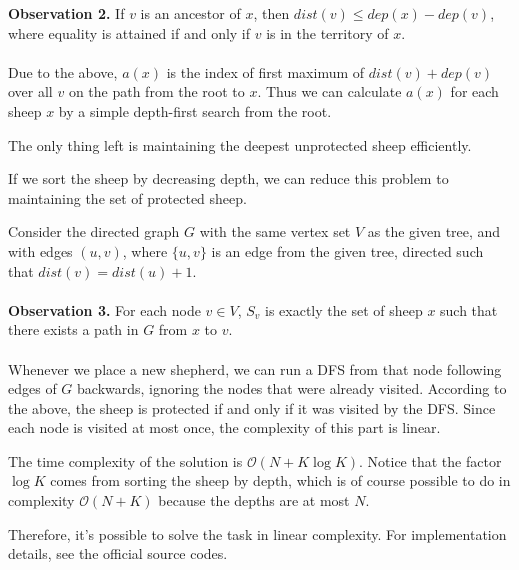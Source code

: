 \textbf{Observation 2.} If $v$ is an ancestor of $x$, then $dist(v) \leq
dep(x) - dep(v)$, where equality is attained if and only if $v$ is in the
territory of $x$.
\\\\
Due to the above, $a(x)$ is the index of first maximum of  
$dist(v) + dep(v)$ over all $v$ on the path from the root to $x$. 
Thus we can calculate $a(x)$ for each sheep $x$ 
by a simple depth-first search from the root.

The only thing left is maintaining the deepest unprotected sheep efficiently.

If we sort the sheep by decreasing depth, 
we can reduce this problem to maintaining the set of protected sheep.

Consider the directed graph $G$ with the same vertex set $V$ as the given tree, and with edges
$(u, v)$, where $\{u, v\}$ is an edge from the given tree, directed 
such that $dist(v) = dist(u) + 1$.
\\\\
\textbf{Observation 3.} For each node $v \in V$, $S_v$ is exactly the set of
sheep $x$ such that there exists a path in $G$ from $x$ to $v$.
\\\\
Whenever we place a new shepherd, we can run a DFS from that node following
edges of $G$ backwards, ignoring the nodes that were already visited. According
to the above, the sheep is protected if and only if it was visited by the DFS.
Since each node is visited at most once, the complexity of this part is linear.

The time complexity of the solution is $\mathcal{O}(N + K\log K)$. 
Notice that the factor
$\log  K$ comes from sorting the sheep by depth, which is of course possible to
do in complexity $\mathcal{O}(N + K)$ because the depths are at most $N$.

Therefore, it's possible to solve the task in linear complexity. For
implementation details, see the official source codes.

